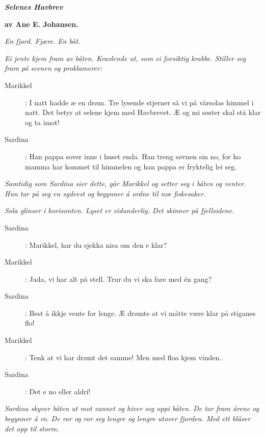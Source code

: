 \bigskip
\bigskip
\bigskip
\bigskip

\label{shtp1}

\begin{center}
  \LARGE\bfseries{\textsl{Selenes Havbrev}}
\end{center}

\bigskip
\bigskip
{\small 
\hfill \textbf{av Ane E. Johansen.}

\bigskip 
 \bigskip

\noindent \textit{\color{gray} En fjord. Fjære. En båt.}

\noindent \textit{\color{gray} Ei jente kjem fram av båten. Kravlende ut, som ei forsiktig krabbe. Stiller seg fram på scenen og proklamerer:}

\begin{description}
\item[Marikkel]: I natt hadde æ en drøm. Tre lysende stjerner så vi på vårsolas himmel i natt. Det betyr at selene kjem med Havbrevet. Æ og mi søster skal stå klar og ta imot! 
\item[Sardina]: Han pappa sover inne i huset enda. Han treng søvnen sin no, for ho mamma har kommet til himmelen og han pappa er fryktelig lei seg.
\end{description}

\noindent \textit{\color{gray} Samtidig som Sardina sier dette, går Marikkel og setter seg i båten og venter. Hun tar på seg en sydvest og begynner å ordne til noe fiskesaker.}

\noindent \textit{\color{gray} Sola glinser i horisonten. Lyset er vidunderlig. Det skinner på fjellsidene.}

\begin{description}
\item[Sardina]: Marikkel, har du sjekka nisa om den e klar?
\item[Marikkel]: Jada, vi har alt på stell. Trur du vi ska fare med én gang?
\item[Sardina]: Best å ikkje vente for lenge. Æ drømte at vi måtte være klar på stiganes flo!
\item[Marikkel]: Tenk at vi har drømt det samme! Men med floa kjem vinden..
\item[Sardina]: Det e no eller aldri!
\end{description}

\noindent \textit{\color{gray} Sardina skyver båten ut mot vannet og hiver seg oppi båten. De tar fram årene og begynner å ro. De ror og ror seg lengre og lengre utover fjorden. Med ett blåser det opp til storm.}

}
